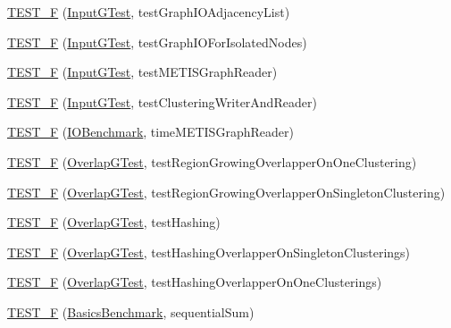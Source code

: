 \begin{DoxyCompactItemize}
\item 
\hyperlink{namespace_networ_kit_a1badbd8faa22ba9d7da2c6acffb57897}{T\-E\-S\-T\-\_\-\-F} (\hyperlink{class_networ_kit_1_1_input_g_test}{Input\-G\-Test}, test\-Graph\-I\-O\-Adjacency\-List)
\item 
\hyperlink{namespace_networ_kit_a2f24a06e45f75caeec4df09b75d604a8}{T\-E\-S\-T\-\_\-\-F} (\hyperlink{class_networ_kit_1_1_input_g_test}{Input\-G\-Test}, test\-Graph\-I\-O\-For\-Isolated\-Nodes)
\item 
\hyperlink{namespace_networ_kit_a36ec61ec5bc474b3725ed82139d9baaa}{T\-E\-S\-T\-\_\-\-F} (\hyperlink{class_networ_kit_1_1_input_g_test}{Input\-G\-Test}, test\-M\-E\-T\-I\-S\-Graph\-Reader)
\item 
\hyperlink{namespace_networ_kit_a9123d4b22507a6441651434fb666892d}{T\-E\-S\-T\-\_\-\-F} (\hyperlink{class_networ_kit_1_1_input_g_test}{Input\-G\-Test}, test\-Clustering\-Writer\-And\-Reader)
\item 
\hyperlink{namespace_networ_kit_aee97d3f13ee3f1c38d22f87787977f02}{T\-E\-S\-T\-\_\-\-F} (\hyperlink{class_networ_kit_1_1_i_o_benchmark}{I\-O\-Benchmark}, time\-M\-E\-T\-I\-S\-Graph\-Reader)
\item 
\hyperlink{namespace_networ_kit_ae7dc36fc4dfa31d3d84b0bb505655ad8}{T\-E\-S\-T\-\_\-\-F} (\hyperlink{class_networ_kit_1_1_overlap_g_test}{Overlap\-G\-Test}, test\-Region\-Growing\-Overlapper\-On\-One\-Clustering)
\item 
\hyperlink{namespace_networ_kit_a7cf6d58689907919cce6119d5a566892}{T\-E\-S\-T\-\_\-\-F} (\hyperlink{class_networ_kit_1_1_overlap_g_test}{Overlap\-G\-Test}, test\-Region\-Growing\-Overlapper\-On\-Singleton\-Clustering)
\item 
\hyperlink{namespace_networ_kit_a39a05014d6ee7cef8919323aef8900b5}{T\-E\-S\-T\-\_\-\-F} (\hyperlink{class_networ_kit_1_1_overlap_g_test}{Overlap\-G\-Test}, test\-Hashing)
\item 
\hyperlink{namespace_networ_kit_a1eda995441aa07c4b81db34b4f534bfe}{T\-E\-S\-T\-\_\-\-F} (\hyperlink{class_networ_kit_1_1_overlap_g_test}{Overlap\-G\-Test}, test\-Hashing\-Overlapper\-On\-Singleton\-Clusterings)
\item 
\hyperlink{namespace_networ_kit_a3182533b4b9203b4d1acdddbe1b7f02c}{T\-E\-S\-T\-\_\-\-F} (\hyperlink{class_networ_kit_1_1_overlap_g_test}{Overlap\-G\-Test}, test\-Hashing\-Overlapper\-On\-One\-Clusterings)
\item 
\hyperlink{namespace_networ_kit_af04baad3988791b80bd77d2a8e1f3fde}{T\-E\-S\-T\-\_\-\-F} (\hyperlink{class_networ_kit_1_1_basics_benchmark}{Basics\-Benchmark}, sequential\-Sum)

\end{DoxyCompactItemize}
